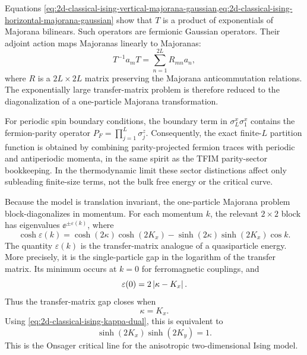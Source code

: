 Equations \cref{eq:2d-classical-ising-vertical-majorana-gaussian,eq:2d-classical-ising-horizontal-majorana-gaussian}
show that $T$ is a product of exponentials of Majorana bilinears.  Such operators
are fermionic Gaussian operators.  Their adjoint action maps Majoranas linearly
to Majoranas:
\begin{equation}
\label{eq:2d-classical-ising-gaussian-adjoint-action}
    T^{-1}a_mT
    =
    \sum_{n=1}^{2L}R_{mn}a_n,
\end{equation}
where $R$ is a $2L\times2L$ matrix preserving the Majorana anticommutation
relations.  The exponentially large transfer-matrix problem is therefore reduced
to the diagonalization of a one-particle Majorana transformation.

\begin{remark}
For periodic spin boundary conditions, the boundary term in
$\sigma_L^x\sigma_1^x$ contains the fermion-parity operator
$P_F=\prod_{j=1}^{L}\sigma_j^z$.  Consequently, the exact finite-$L$ partition
function is obtained by combining parity-projected fermion traces with periodic
and antiperiodic momenta, in the same spirit as the TFIM parity-sector
bookkeeping.  In the thermodynamic limit these sector distinctions affect only
subleading finite-size terms, not the bulk free energy or the critical curve.
\end{remark}

Because the model is translation invariant, the one-particle Majorana problem
block-diagonalizes in momentum.  For each momentum $k$, the relevant
$2\times2$ block has eigenvalues $\ee^{\pm\varepsilon(k)}$, where
\begin{equation}
\label{eq:2d-classical-ising-onsager-dispersion}
    \cosh\varepsilon(k)
    =
    \cosh(2\kappa)\cosh(2K_x)
    -
    \sinh(2\kappa)\sinh(2K_x)\cos k .
\end{equation}
The quantity $\varepsilon(k)$ is the transfer-matrix analogue of a quasiparticle
energy.  More precisely, it is the single-particle gap in the logarithm of the
transfer matrix.  Its minimum occurs at $k=0$ for ferromagnetic couplings, and
\begin{equation}
\label{eq:2d-classical-ising-transfer-gap}
    \varepsilon(0)
    =
    2\left|\kappa-K_x\right| .
\end{equation}
Thus the transfer-matrix gap closes when
\begin{equation}
\label{eq:2d-classical-ising-kappa-equals-kx}
    \kappa=K_x .
\end{equation}
Using \cref{eq:2d-classical-ising-kappa-dual}, this is equivalent to
\begin{equation}
\label{eq:2d-classical-ising-onsager-critical}
    \boxed{\sinh(2K_x)\sinh(2K_y)=1.}
\end{equation}
This is the Onsager critical line for the anisotropic two-dimensional Ising
model.

